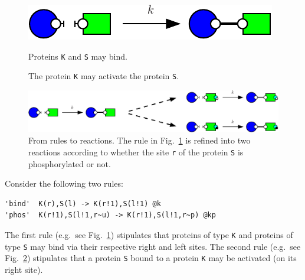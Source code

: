 \documentclass[11pt]{book}
\begin{document}
\begin{figure}[t]
\begin{minipage}{\linewidth}
    \centering\scalebox{0.7}%
    {\includegraphics[bb=0 0 198 28]{gkappa_img/sect1-bind.pdf}}
  \end{minipage}
  \caption{Proteins \texttt{K} and \texttt{S} may bind.}
  \label{fig:sec1:bind}
\end{figure}
\begin{figure}[t]
\begin{minipage}{\linewidth}
\centering{}
\end{minipage}
\caption{The protein \texttt{K} may activate the protein \texttt{S}.}
\label{fig:sec1:phos}
\end{figure}
\begin{figure}[t]
\centering\hspace*{5mm}\includegraphics[width=1.3\linewidth,bb=0 0 789 132]{gkappa_img/ref.pdf}
  \caption{From rules to reactions. The rule in Fig.~\ref{fig:sec1:bind} is refined into two reactions according to whether the site \texttt{r} of the protein \texttt{S} is phosphorylated or not.}
  \label{fig:refinement}
\end{figure}

Consider the following two rules:
\begin{lstlisting}[language=kappa]
'bind'  K(r),S(l) -> K(r!1),S(l!1) @k
'phos'  K(r!1),S(l!1,r~u) -> K(r!1),S(l!1,r~p) @kp
\end{lstlisting}




 The first rule (e.g.~see Fig.~\ref{fig:sec1:bind}) stipulates that proteins of type \texttt{K} and proteins of type \texttt{S} may bind via their respective right and left sites. The second rule (e.g.~see Fig.~\ref{fig:sec1:phos})  stipulates that a protein \texttt{S} bound to a protein \texttt{K} may be activated (on its right site).
\end{document}
